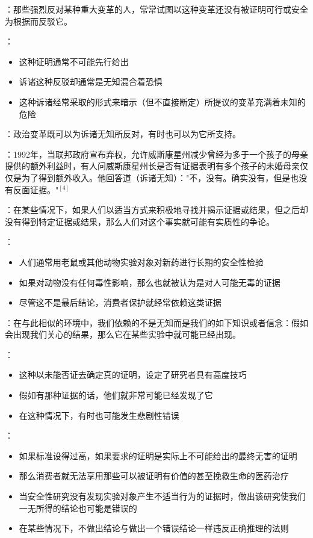 \begin{examplebox}[title=政治变革中的诉诸无知]
：那些强烈反对某种重大变革的人，常常试图以这种变革还没有被证明可行或安全为根据而反驳它。

：
\begin{itemize}
  \item 这种证明通常不可能先行给出
  \item 诉诸这种反驳却通常是无知混合着恐惧
  \item 这种诉诸经常采取的形式来暗示（但不直接断定）所提议的变革充满着未知的危险
\end{itemize}

：政治变革既可以为诉诸无知所反对，有时也可以为它所支持。

：1992年，当联邦政府宣布弃权，允许威斯康星州减少曾经为多于一个孩子的母亲提供的额外利益时，有人问威斯康星州长是否有证据表明有多个孩子的未婚母亲仅仅是为了得到额外收入。他回答道（诉诸无知）："不，没有。确实没有，但是也没有反面证据。"$^{[4]}$
\end{examplebox}

\begin{theorembox}[title=诉诸无知的合理应用]
：在某些情况下，如果人们以适当方式来积极地寻找并揭示证据或结果，但之后却没有得到特定证据或结果，那么人们对这个事实就可能有实质性的争论。

：
\begin{itemize}
  \item 人们通常用老鼠或其他动物实验对象对新药进行长期的安全性检验
  \item 如果对动物没有任何毒性影响，那么也就被认为是对人可能无毒的证据
  \item 尽管这不是最后结论，消费者保护就经常依赖这类证据
\end{itemize}

：在与此相似的环境中，我们依赖的不是无知而是我们的如下知识或者信念：假如会出现我们关心的结果，那么它在某些实验中就可能已经出现。

：
\begin{itemize}
  \item 这种以未能否证去确定真的证明，设定了研究者具有高度技巧
  \item 假如有那种证据的话，他们就非常可能已经发现了它
  \item 在这种情况下，有时也可能发生悲剧性错误
\end{itemize}

：
\begin{itemize}
  \item 如果标准设得过高，如果要求的证明是实际上不可能给出的最终无害的证明
  \item 那么消费者就无法享用那些可以被证明有价值的甚至挽救生命的医药治疗
  \item 当安全性研究没有发现实验对象产生不适当行为的证据时，做出该研究使我们一无所得的结论也可能是错误的
  \item 在某些情况下，不做出结论与做出一个错误结论一样违反正确推理的法则
\end{itemize}
\end{theorembox}

